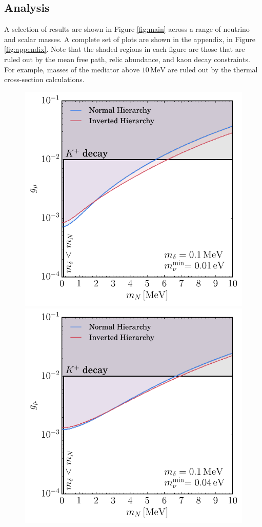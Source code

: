 \documentclass[11pt]{article}
\numberwithin{equation}{section}
\numberwithin{figure}{section}
\numberwithin{table}{section}
\begin{document}
\subsection{Analysis}
A selection of results are shown in Figure \ref{fig:main} across a range of neutrino and scalar masses. A complete set of plots are shown in the appendix, in Figure \ref{fig:appendix}. Note that the shaded regions in each figure are those that are ruled out by the mean free path, relic abundance, and kaon decay constraints. For example, masses of the mediator above $10 \, \textrm{MeV}$ are ruled out by the thermal cross-section calculations.
\begin{figure}[t]
 \centering
 \includegraphics[width=.48\textwidth]{1.pdf}\quad
 \includegraphics[width=.48\textwidth]{3.pdf}

 \medskip


\end{figure}
\end{document}
